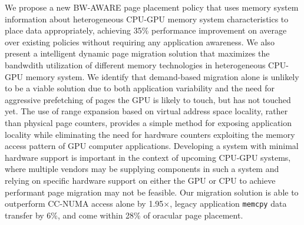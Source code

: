 We propose a new BW-AWARE page placement policy that uses memory system
information about heterogeneous CPU-GPU memory system characteristics to place
data appropriately, achieving 35\% performance improvement on average over
existing policies without requiring any application awareness.
%
%
We also present a intelligent dynamic page migration solution that maximizes the
bandwdith utilization of different memory technologies in heterogeneous CPU-GPU
memory system.  We identify that demand-based migration alone is unlikely to be
a viable solution due to both application variability and the need for
aggressive prefetching of pages the GPU is likely to touch, but has not touched
yet.  The use of range expansion based on virtual address space locality, rather
than physical page counters, provides a simple method for exposing application
locality while eliminating the need for hardware counters exploiting the memory
access pattern of GPU computer applications.  Developing a system with minimal
hardware support is important in the context of upcoming CPU-GPU systems, where
multiple vendors may be supplying components in such a system and relying on
specific hardware support on either the GPU or CPU to achieve performant page
migration may not be feasible.  Our migration solution is able to outperform
CC-NUMA access alone by 1.95$\times$, legacy application {\tt memcpy} data
transfer by 6\%, and come within 28\% of oracular page placement.

